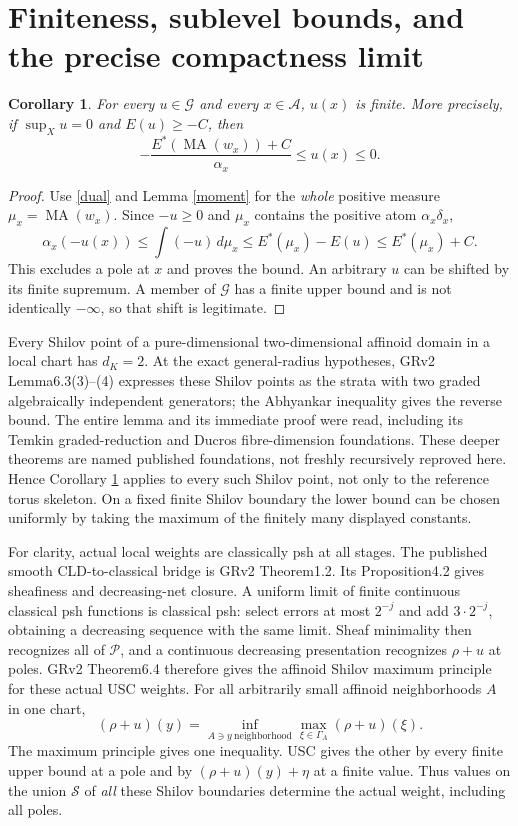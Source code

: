 \documentclass[11pt]{article}
\newcommand{\MA}{\operatorname{MA}}
\newcommand{\G}{\mathcal G}
\newtheorem{corollary}[theorem]{Corollary}
\theoremstyle{remark}\newtheorem{remark}[theorem]{Remark}
\begin{document}
\section{Finiteness, sublevel bounds, and the precise compactness limit}
\begin{corollary}\label{finite}
For every $u\in\G$ and every $x\in\mathscr A$, $u(x)$ is finite.
More precisely, if $\sup_Xu=0$ and $E(u)\ge-C$, then
\[
 -\frac{E^*(\MA(w_x))+C}{\alpha_x}\le u(x)\le0 .
\]
\end{corollary}
\begin{proof}
Use \eqref{dual} and Lemma \ref{moment} for the \emph{whole}
positive measure $\mu_x=\MA(w_x)$.
Since $-u\ge0$ and $\mu_x$ contains the positive atom
$\alpha_x\delta_x$,
\[
 \alpha_x(-u(x))\le\int(-u)\,d\mu_x
 \le E^*(\mu_x)-E(u)\le E^*(\mu_x)+C.
\]
This excludes a pole at $x$ and proves the bound.
An arbitrary $u$ can be shifted by its finite supremum.
A member of $\G$ has a finite upper bound and is not identically
$-\infty$, so that shift is legitimate.
\end{proof}

Every Shilov point of a pure-dimensional two-dimensional affinoid
domain in a local chart has $d_K=2$. At the exact general-radius
hypotheses, GRv2 Lemma6.3(3)--(4) expresses these Shilov points as
the strata with two graded algebraically independent generators;
the Abhyankar inequality gives the reverse bound.
The entire lemma and its immediate proof were read, including its
Temkin graded-reduction and Ducros fibre-dimension foundations.
These deeper theorems are named published foundations, not freshly
recursively reproved here. Hence Corollary \ref{finite} applies to
every such Shilov point, not only to the reference torus skeleton.
On a fixed finite Shilov boundary the lower bound can be chosen
uniformly by taking the maximum of the finitely many displayed
constants.

For clarity, actual local weights are classically psh at all
stages. The published smooth CLD-to-classical bridge is GRv2
Theorem1.2. Its Proposition4.2 gives sheafiness and decreasing-net
closure. A uniform limit of finite continuous classical psh
functions is classical psh: select errors at most $2^{-j}$ and add
$3\cdot2^{-j}$, obtaining a decreasing sequence with the same limit.
Sheaf minimality then recognizes all of $\mathscr P$, and a
continuous decreasing presentation recognizes $\rho+u$ at poles.
GRv2 Theorem6.4 therefore gives the affinoid Shilov maximum
principle for these actual USC weights.
For all arbitrarily small affinoid neighborhoods $A$ in one chart,
\[
 (\rho+u)(y)=\inf_{A\ni y\ \mathrm{neighborhood}}
                \max_{\xi\in\Gamma_A}(\rho+u)(\xi).
\]
The maximum principle gives one inequality. USC gives the other
by every finite upper bound at a pole and by
$(\rho+u)(y)+\eta$ at a finite value. Thus values on the union
$\mathscr S$ of \emph{all} these Shilov boundaries determine the
actual weight, including all poles.
\end{document}
